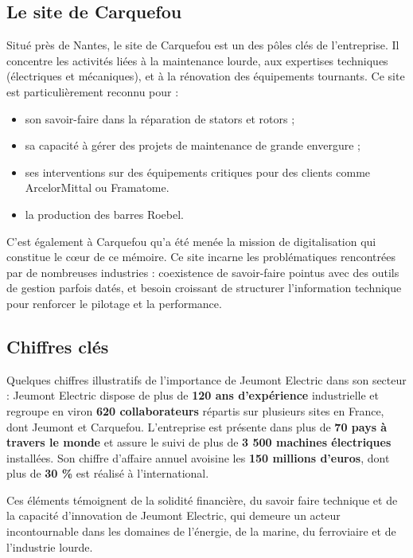 \documentclass[11pt,a4paper]{article}
\begin{document}
\subsection{Le site de Carquefou}

Situé près de Nantes, le site de Carquefou est un des pôles clés de l’entreprise. Il concentre les activités liées à la maintenance lourde, aux expertises techniques (électriques et mécaniques), et à la rénovation des équipements tournants. Ce site est particulièrement reconnu pour :
\begin{itemize}
    \item son savoir-faire dans la réparation de stators et rotors ;
    \item sa capacité à gérer des projets de maintenance de grande envergure ;
    \item ses interventions sur des équipements critiques pour des clients comme ArcelorMittal ou Framatome.
    \item la production des barres Roebel.
\end{itemize}

C’est également à Carquefou qu’a été menée la mission de digitalisation qui constitue le cœur de ce mémoire. Ce site incarne les problématiques rencontrées par de nombreuses industries : coexistence de savoir-faire pointus avec des outils de gestion parfois datés, et besoin croissant de structurer l’information technique pour renforcer le pilotage et la performance.

\subsection{Chiffres clés}
Quelques chiffres illustratifs de l'importance de Jeumont Electric dans son secteur :
Jeumont Electric dispose de plus de \textbf{120 ans d'expérience} industrielle et regroupe en viron \textbf{620 collaborateurs} répartis sur plusieurs sites en France, dont Jeumont et Carquefou.
L'entreprise est présente dans plus de \textbf{70 pays à travers le monde} et assure le suivi de plus de \textbf{3 500 machines électriques} installées. Son chiffre d'affaire annuel avoisine les \textbf{150 millions d'euros}, dont plus de \textbf{30 \% }est réalisé à l'international.

Ces éléments témoignent de la solidité financière, du savoir faire technique et de la capacité d'innovation de Jeumont Electric, qui demeure un acteur incontournable dans les domaines de l'énergie, de la marine, du ferroviaire et de l'industrie lourde.
\end{document}
